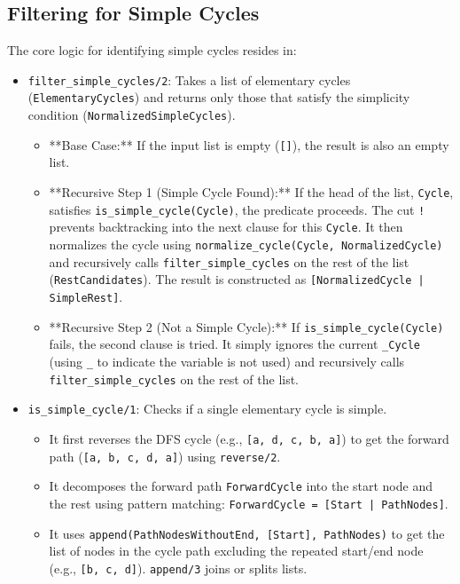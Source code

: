 \documentclass[12pt,a4paper]{article}
\begin{document}
\subsection{Filtering for Simple Cycles}
The core logic for identifying simple cycles resides in:
\begin{itemize}
    \item \texttt{filter\_simple\_cycles/2}: Takes a list of elementary cycles (\texttt{ElementaryCycles}) and returns only those that satisfy the simplicity condition (\texttt{NormalizedSimpleCycles}).
        \begin{itemize}
            \item **Base Case:** If the input list is empty (\texttt{[]}), the result is also an empty list.
            \item **Recursive Step 1 (Simple Cycle Found):** If the head of the list, \texttt{Cycle}, satisfies \texttt{is\_simple\_cycle(Cycle)}, the predicate proceeds. The cut \texttt{!} prevents backtracking into the next clause for this \texttt{Cycle}. It then normalizes the cycle using \texttt{normalize\_cycle(Cycle, NormalizedCycle)} and recursively calls \texttt{filter\_simple\_cycles} on the rest of the list (\texttt{RestCandidates}). The result is constructed as \texttt{[NormalizedCycle | SimpleRest]}.
            \item **Recursive Step 2 (Not a Simple Cycle):** If \texttt{is\_simple\_cycle(Cycle)} fails, the second clause is tried. It simply ignores the current \texttt{\_Cycle} (using \texttt{\_} to indicate the variable is not used) and recursively calls \texttt{filter\_simple\_cycles} on the rest of the list.
        \end{itemize}
    \item \texttt{is\_simple\_cycle/1}: Checks if a single elementary cycle is simple.
        \begin{itemize}
            \item It first reverses the DFS cycle (e.g., \texttt{[a, d, c, b, a]}) to get the forward path (\texttt{[a, b, c, d, a]}) using \texttt{reverse/2}.
            \item It decomposes the forward path \texttt{ForwardCycle} into the start node and the rest using pattern matching: \texttt{ForwardCycle = [Start | PathNodes]}.
            \item It uses \texttt{append(PathNodesWithoutEnd, [Start], PathNodes)} to get the list of nodes in the cycle path excluding the repeated start/end node (e.g., \texttt{[b, c, d]}). \texttt{append/3} joins or splits lists.

\end{itemize}
\end{itemize}
\end{document}
